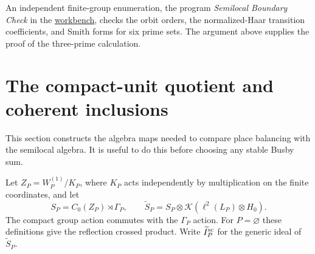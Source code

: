 \documentclass[11pt]{article}
\newcommand{\workbenchurl}{https://github.com/KokunoYumeto/schemes-and-moduli-workbench}
\newcommand{\K}{\mathcal K}
\theoremstyle{definition}
\theoremstyle{remark}
\begin{document}
An independent finite-group enumeration, the program \emph{Semilocal Boundary Check} in the \href{\workbenchurl}{workbench}, checks the orbit orders, the normalized-Haar transition coefficients, and Smith forms for six prime sets. The argument above supplies the proof of the three-prime calculation.

\section{The compact-unit quotient and coherent inclusions}

This section constructs the algebra maps needed to compare place balancing with the semilocal algebra. It is useful to do this before choosing any stable Busby sum.

Let $Z_P=W_P^{(1)}/K_P$, where $K_P$ acts independently by multiplication on the finite coordinates, and let
\[
 S_P=C_0(Z_P)\rtimes\Gamma_P,
 \qquad
 \widetilde S_P=S_P\otimes\K(\ell^2(L_P)\otimes H_0).
\]
The compact group action commutes with the $\Gamma_P$ action. For $P=\varnothing$ these definitions give the reflection crossed product. Write $\widetilde I_P^{\rm sc}$ for the generic ideal of $\widetilde S_P$.
\end{document}
